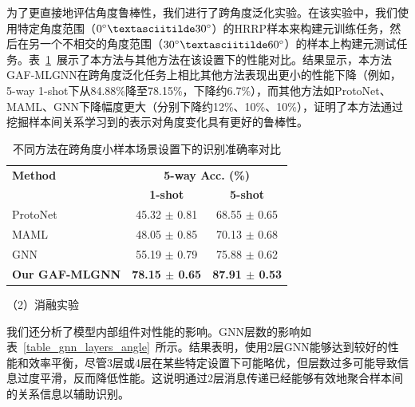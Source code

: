 为了更直接地评估角度鲁棒性，我们进行了跨角度泛化实验。在该实验中，我们使用特定角度范围（$0^\circ \textasciitilde 30^\circ$）的HRRP样本来构建元训练任务，然后在另一个不相交的角度范围（$30^\circ \textasciitilde 60^\circ$）的样本上构建元测试任务。表~\ref{tab:cross_angle}~展示了本方法与其他方法在该设置下的性能对比。结果显示，本方法GAF-MLGNN在跨角度泛化任务上相比其他方法表现出更小的性能下降（例如，5-way 1-shot下从84.88\%降至78.15\%，下降约6.7\%），而其他方法如ProtoNet、MAML、GNN下降幅度更大（分别下降约12\%、10\%、10\%），证明了本方法通过挖掘样本间关系学习到的表示对角度变化具有更好的鲁棒性。

\begin{table}[h!]
\centering
\caption{不同方法在跨角度小样本场景设置下的识别准确率对比}
\begin{tabular}{lcc}
\toprule
\multirow{2.5}{*}{\textbf{Method}} & \multicolumn{2}{c}{\textbf{5-way Acc. (\%)}} \\
\cmidrule(lr){2-3}
& \textbf{1-shot} & \textbf{5-shot} \\
\midrule
ProtoNet~\cite{snell_prototypical_2017} & 45.32 
$\pm$
 0.81 & 68.55 
$\pm$
 0.65 \\ %
MAML~\cite{finn_model-agnostic_2017}   & 48.05 
$\pm$
 0.85 & 70.13 
$\pm$
 0.68 \\ %
GNN~\cite{garcia_gnn_2018}      & 55.19 
$\pm$
 0.79 & 75.88 
$\pm$
 0.62 \\ %
\textbf{Our GAF-MLGNN}           & \textbf{78.15 
$\pm$
 0.65} & \textbf{87.91 
$\pm$
 0.53} \\ %
\bottomrule
\end{tabular}
\label{tab:cross_angle}
\end{table}

（2）消融实验

我们还分析了模型内部组件对性能的影响。GNN层数的影响如表~\ref{table_gnn_layers_angle}~所示。结果表明，使用2层GNN能够达到较好的性能和效率平衡，尽管3层或4层在某些特定设置下可能略优，但层数过多可能导致信息过度平滑，反而降低性能。这说明通过2层消息传递已经能够有效地聚合样本间的关系信息以辅助识别。

